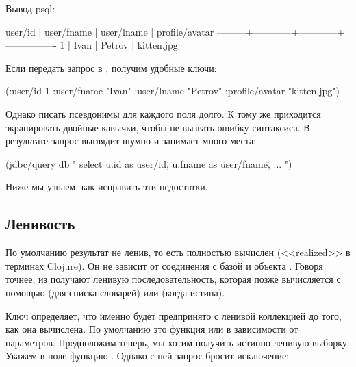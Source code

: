 Вывод psql:

\begin{english}
  \begin{text}
 user/id | user/fname | user/lname | profile/avatar
---------+------------+------------+----------------
       1 | Ivan       | Petrov     | kitten.jpg
  \end{text}
\end{english}

Если передать запрос в , получим удобные ключи:

\begin{english}
  \begin{clojure}
({:user/id 1
  :user/fname "Ivan"
  :user/lname "Petrov"
  :profile/avatar "kitten.jpg"})
  \end{clojure}
\end{english}

Однако писать псевдонимы для каждого поля долго. К тому же приходится экранировать двойные кавычки, чтобы не вызвать ошибку синтаксиса. В результате запрос выглядит шумно и занимает много места:

\begin{english}
  \begin{clojure}
(jdbc/query db "
select
u.id as \"user/id\",
u.fname as \"user/fname\",
...
")
  \end{clojure}
\end{english}

Ниже мы узнаем, как исправить эти недостатки.

\subsection{Ленивость}


По умолчанию результат  не ленив, то есть полностью вычислен (<<realized>> в терминах Clojure). Он не зависит от соединения с базой и объекта . Говоря точнее, из  получают ленивую последовательность, которая позже вычисляется с помощью  (для списка словарей) или  (когда  истина).

Ключ  определяет, что именно будет предпринято с ленивой коллекцией до того, как она вычислена. По умолчанию это функция  или  в зависимости от параметров. Предположим теперь, мы хотим получить истинно ленивую выборку. Укажем в поле  функцию . Однако с ней запрос бросит исключение:

